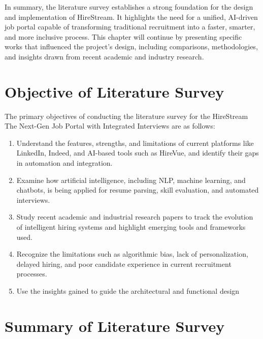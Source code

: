 \documentclass[a4paper, 12pt]{report}
\begin{document}
In summary, the literature survey establishes a strong foundation for the design and implementation of HireStream. It highlights the need for a unified, AI-driven job portal capable of transforming traditional recruitment into a faster, smarter, and more inclusive process. This chapter will continue by presenting specific works that influenced the project’s design, including comparisons, methodologies, and insights drawn from recent academic and industry research.

\section{Objective of Literature Survey}
The primary objectives of conducting the literature survey for the HireStream The Next-Gen Job Portal with Integrated Interviews are as follows:
\begin{enumerate}[itemsep=-4pt, label=\roman*.]
    \item Understand the features, strengths, and limitations of current platforms like LinkedIn, Indeed, and AI-based tools such as HireVue, and identify their gaps in automation and integration.
    \item Examine how artificial intelligence, including NLP, machine learning, and chatbots, is being applied for resume parsing, skill evaluation, and automated interviews.
    \item Study recent academic and industrial research papers to track the evolution of intelligent hiring systems and highlight emerging tools and frameworks used.
    \item Recognize the limitations such as algorithmic bias, lack of personalization, delayed hiring, and poor candidate experience in current recruitment processes.
    \item Use the insights gained to guide the architectural and functional design 
\end{enumerate}

\section{Summary of Literature Survey}
\end{document}

